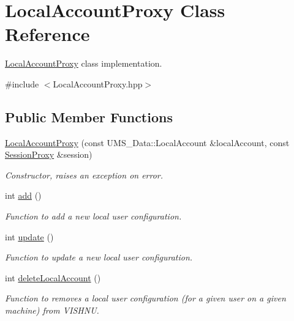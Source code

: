 \hypertarget{classLocalAccountProxy}{
\section{LocalAccountProxy Class Reference}
\label{classLocalAccountProxy}
}


\hyperlink{classLocalAccountProxy}{LocalAccountProxy} class implementation.  




{\ttfamily \#include $<$LocalAccountProxy.hpp$>$}

\subsection*{Public Member Functions}
\begin{DoxyCompactItemize}
\item 
\hyperlink{classLocalAccountProxy_a101ce2caca3aa0f876e4abd477a4d914}{LocalAccountProxy} (const UMS\_\-Data::LocalAccount \&localAccount, const \hyperlink{classSessionProxy}{SessionProxy} \&session)
\begin{DoxyCompactList}\small\item\em Constructor, raises an exception on error. \item\end{DoxyCompactList}\item 
int \hyperlink{classLocalAccountProxy_a0676a2d914681e61a401e5cb60ccd0ad}{add} ()
\begin{DoxyCompactList}\small\item\em Function to add a new local user configuration. \item\end{DoxyCompactList}\item 
int \hyperlink{classLocalAccountProxy_adfa887a4617b82987d06bccba52b1950}{update} ()
\begin{DoxyCompactList}\small\item\em Function to update a new local user configuration. \item\end{DoxyCompactList}\item 
int \hyperlink{classLocalAccountProxy_a103fa168212c2a8e6c1e68927c4ff289}{deleteLocalAccount} ()
\begin{DoxyCompactList}\small\item\em Function to removes a local user configuration (for a given user on a given machine) from VISHNU. \item\end{DoxyCompactList}\item 

\end{DoxyCompactItemize}
